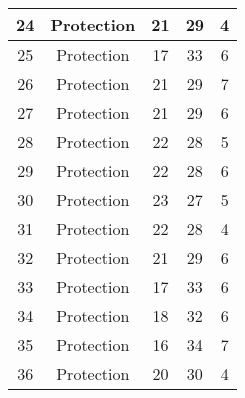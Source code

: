 \documentclass[results.tex]{subfiles}
\begin{document}
\begin{center}
\begin{tabular}{| c || c | c | c | c |}
            \hline
            24                      & Protection                   & 21                     & 29                      & 4                    \\
            \hline
            25                      & Protection                   & 17                     & 33                      & 6                    \\
            \hline
            26                      & Protection                   & 21                     & 29                      & 7                    \\
            \hline
            27                      & Protection                   & 21                     & 29                      & 6                    \\
            \hline
            28                      & Protection                   & 22                     & 28                      & 5                    \\
            \hline
            29                      & Protection                   & 22                     & 28                      & 6                    \\
            \hline
            30                      & Protection                   & 23                     & 27                      & 5                    \\
            \hline
            31                      & Protection                   & 22                     & 28                      & 4                    \\
            \hline
            32                      & Protection                   & 21                     & 29                      & 6                    \\
            \hline
            33                      & Protection                   & 17                     & 33                      & 6                    \\
            \hline
            34                      & Protection                   & 18                     & 32                      & 6                    \\
            \hline
            35                      & Protection                   & 16                     & 34                      & 7                    \\
            \hline
            36                      & Protection                   & 20                     & 30                      & 4                    \\

\end{tabular}
\end{center}
\end{document}

